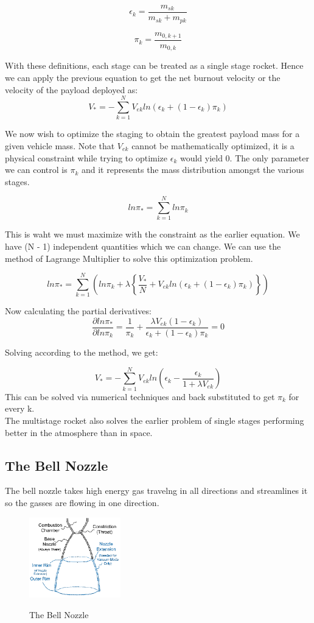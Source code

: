 \documentclass[12pt, letterpaper]{article}
\begin{document}
\[
	\epsilon_k = \frac{m_{sk}}{m_{sk} + m_{pk}}
\] 

\[
	\pi_k = \frac{m_{0,k+1}}{m_{0,k}}
\]

With these definitions, each stage can be treated as a single stage rocket. Hence we can apply the previous equation to get the net burnout velocity or the velocity of the payload deployed as:
\[
	V_* = - \sum_{k=1}^{N} V_{ek}ln(\epsilon_k + (1-\epsilon_k) \pi_k)
\]

We now wish to optimize the staging to obtain the greatest payload mass for a given vehicle mass. Note that $V_{ek}$ cannot be mathematically optimized, it is a physical constraint while trying to optimize $\epsilon_{k}$ would yield $0$. The only parameter we can control is $\pi_k$ and it represents the mass distribution amongst the various stages.

\[
	ln\pi_* = \sum_{k=1}^{N} ln\pi_k
\]

This is waht we must maximize with the constraint as the earlier equation. We have (N - 1) independent quantities which we can change. We can use the method of Lagrange Multiplier to solve this optimization problem.

\[
	ln\pi_* = \sum_{k=1}^{N}\left( ln\pi_k + \lambda \left\{ \frac{V_*}{N} + V_{ek}ln(\epsilon_k + (1-\epsilon_k) \pi_k) \right\} \right) 
\]

Now calculating the partial derivatives:
\[
	\frac{\partial ln\pi_*}{\partial ln\pi_k} = \frac{1}{\pi_k} + \frac{\lambda V_{ek}(1 - \epsilon_k)}{\epsilon_k + (1-\epsilon_k) \pi_k} = 0
\]

Solving according to the method, we get:

\[
	V_* = - \sum_{k=1}^{N} V_{ek} ln\left( \epsilon_k - \frac{\epsilon_k}{1 + \lambda V_{ek}} \right)
\]
This can be solved via numerical techniques and back substituted to get $\pi_k$ for every k.\\

The multistage rocket also solves the earlier problem of single stages performing better in the atmosphere than in space. 
\newpage
\subsection{The Bell Nozzle}
The bell nozzle takes high energy gas travelng in all directions and streamlines it so the gasses are flowing in one direction.

\begin{figure}[ht]
	\centering
    \includegraphics[width = 150px]{nozzle}
    \label{fig:nozzle}
    \caption{The Bell Nozzle}
\end{figure}
\end{document}
